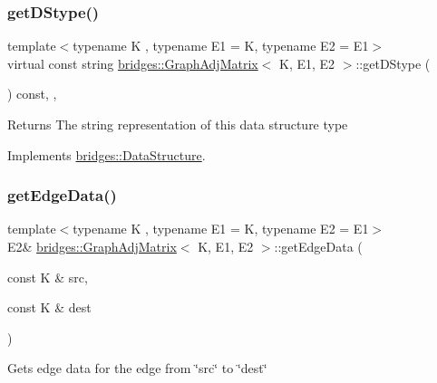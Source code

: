 \subsubsection{\texorpdfstring{get\+D\+Stype()}{getDStype()}}
{\footnotesize\ttfamily template$<$typename K , typename E1  = K, typename E2  = E1$>$ \\
virtual const string \mbox{\hyperlink{classbridges_1_1_graph_adj_matrix}{bridges\+::\+Graph\+Adj\+Matrix}}$<$ K, E1, E2 $>$\+::get\+D\+Stype (\begin{DoxyParamCaption}{ }\end{DoxyParamCaption}) const\hspace{0.3cm}{\ttfamily [inline]}, {\ttfamily [override]}, {\ttfamily [virtual]}}

\begin{DoxyReturn}{Returns}
The string representation of this data structure type 
\end{DoxyReturn}


Implements \mbox{\hyperlink{classbridges_1_1_data_structure_a957a63b106e340bc753620c650632bdc}{bridges\+::\+Data\+Structure}}.

\mbox{\label{classbridges_1_1_graph_adj_matrix_abbbb63d19c803973b51aa4379731e177}} 
\subsubsection{\texorpdfstring{get\+Edge\+Data()}{getEdgeData()}}
{\footnotesize\ttfamily template$<$typename K , typename E1  = K, typename E2  = E1$>$ \\
E2\& \mbox{\hyperlink{classbridges_1_1_graph_adj_matrix}{bridges\+::\+Graph\+Adj\+Matrix}}$<$ K, E1, E2 $>$\+::get\+Edge\+Data (\begin{DoxyParamCaption}\item[{const K \&}]{src,  }\item[{const K \&}]{dest }\end{DoxyParamCaption})\hspace{0.3cm}{\ttfamily [inline]}}

Gets edge data for the edge from \char`\"{}src\char`\"{} to \char`\"{}dest\char`\"{}


